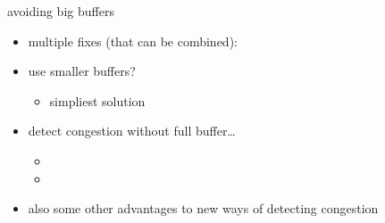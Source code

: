 \begin{frame}{avoiding big buffers}
    \begin{itemize}
    \item multiple fixes (that can be combined):
    \vspace{.5cm}
    \item use smaller buffers?
        \begin{itemize}
        \item simpliest solution
        \end{itemize}
    \item detect congestion without full buffer\ldots
        \begin{itemize}
        \item {}
        \item {}
        \end{itemize}
    \vspace{.5cm}
    \item<2-> also some other advantages to new ways of detecting congestion
    \end{itemize}
\end{frame}

